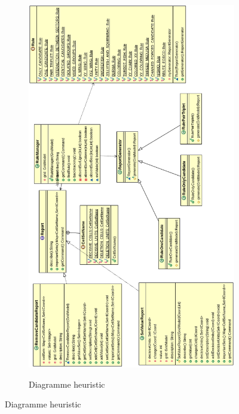 \begin{figure}[ht]
\begin{figure}[ht]
  \caption{\label{annexe18} Diagramme heuristic}
  \includegraphics [width=140mm]{images/heuristic.png} \\[0.5cm]
\end{figure}


\end{figure}
